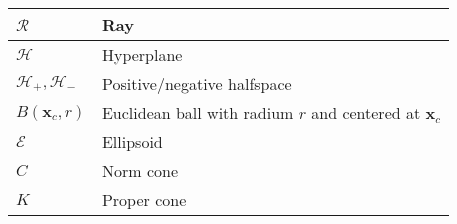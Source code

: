 \begin{xltabular}{\textwidth}{XX}
	\(\mathcal{R}\)                                                                                                          & Ray                                                                                                                                                                                                            \\ \hline
	\(\mathcal{H}\)                                                                                                          & Hyperplane                                                                                                                                                                                                     \\ \hline
	\(\mathcal{H}_{+}, \mathcal{H}_{-}\)                                                                                     & Positive/negative halfspace                                                                                                                                                                                    \\ \hline
	\(B(\mathbf{x}_c, r)\)                                                                                                   & Euclidean ball with radium \(r\) and centered at \(\mathbf{x}_c\)                                                                                                                                              \\ \hline
	\(\mathcal{E}\)                                                                                                          & Ellipsoid                                                                                                                                                                                                      \\ \hline
	\(C\)                                                                                                                    & Norm cone                                                                                                                                                                                                      \\ \hline
	\(K\)                                                                                                                    & Proper cone                                                                                                                                                                                                    \\ \hline

\end{xltabular}
